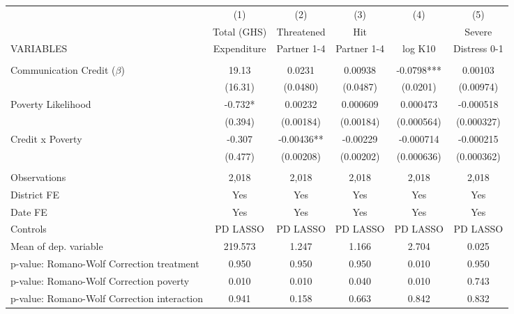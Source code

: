 \begin{tabular}{lccccc} \hline
 & (1) & (2) & (3) & (4) & (5) \\
 & Total (GHS) & Threatened & Hit &  & Severe \\
VARIABLES & Expenditure & Partner 1-4 & Partner 1-4 & log K10 & Distress 0-1 \\ \hline
 &  &  &  &  &  \\
Communication Credit ($\beta$) & 19.13 & 0.0231 & 0.00938 & -0.0798*** & 0.00103 \\
 & (16.31) & (0.0480) & (0.0487) & (0.0201) & (0.00974) \\
Poverty Likelihood & -0.732* & 0.00232 & 0.000609 & 0.000473 & -0.000518 \\
 & (0.394) & (0.00184) & (0.00184) & (0.000564) & (0.000327) \\
Credit x Poverty & -0.307 & -0.00436** & -0.00229 & -0.000714 & -0.000215 \\
 & (0.477) & (0.00208) & (0.00202) & (0.000636) & (0.000362) \\
 &  &  &  &  &  \\
Observations & 2,018 & 2,018 & 2,018 & 2,018 & 2,018 \\
District FE & Yes & Yes & Yes & Yes & Yes \\
Date FE & Yes & Yes & Yes & Yes & Yes \\
Controls & PD LASSO & PD LASSO & PD LASSO & PD LASSO & PD LASSO \\
Mean of dep. variable & 219.573 & 1.247 & 1.166 & 2.704 & 0.025 \\
p-value: Romano-Wolf Correction treatment & 0.950 & 0.950 & 0.950 & 0.010 & 0.950 \\
p-value: Romano-Wolf Correction poverty & 0.010 & 0.010 & 0.040 & 0.010 & 0.743 \\
 p-value: Romano-Wolf Correction interaction & 0.941 & 0.158 & 0.663 & 0.842 & 0.832 \\ \hline
\end{tabular}

